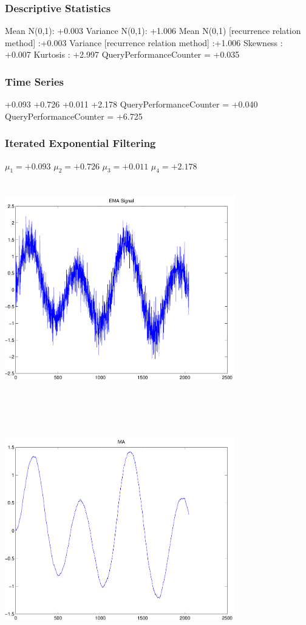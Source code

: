 \documentclass[9pt]{article}
\theoremstyle{plain}
\theoremstyle{definition}
\theoremstyle{remark}
\numberwithin{equation}{section}
\begin{document}
\subsubsection{Descriptive Statistics}
Mean N(0,1): +0.003
Variance N(0,1): +1.006
Mean N(0,1) [recurrence relation method] :+0.003
Variance [recurrence relation method] :+1.006
Skewness : +0.007
Kurtosis : +2.997
QueryPerformanceCounter  =  +0.035
\subsubsection{Time Series }
+0.093
+0.726
+0.011
+2.178
QueryPerformanceCounter  =  +0.040
QueryPerformanceCounter  =  +6.725
\subsubsection{Iterated Exponential Filtering }
$\mu_1 =+0.093$
$\mu_2 =+0.726$
$\mu_3 =+0.011$
$\mu_4 =+2.178$
\includegraphics[width=10.0cm,height=10.0cm]{EMA_signal.pdf}

\includegraphics[width=10.0cm,height=10.0cm]{MA.pdf}
\end{document}
